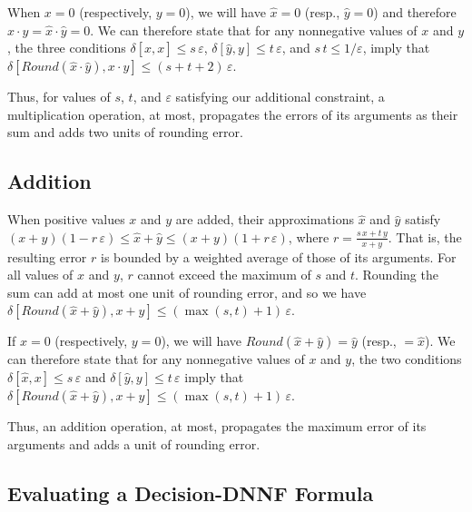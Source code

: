 \documentclass[letterpaper,USenglish,cleveref, autoref, thm-restate]{lipics-v2021}
\newcommand{\approximate}[1]{\hat{#1}}
\newcommand{\approxx}{\approximate{x}}
\newcommand{\approxy}{\approximate{y}}
\newcommand{\round}{\mathit{Round}}
\newcommand{\aerror}{\delta}
\newcommand{\roundepsilon}{\varepsilon}
\begin{document}
When $x=0$ (respectively, $y=0$), we will have $\approxx=0$ (resp., $\approxy = 0$) and therefore $x \cdot y = \approxx \cdot \approxy = 0$.
We can therefore state that  for any nonnegative values of $x$ and $y$, the three conditions $\aerror[\approxx, x] \leq s\,\roundepsilon$,
$\aerror[\approxy, y] \leq t\,\roundepsilon$, and
$s\,t \leq 1/\roundepsilon$, imply that
$\aerror[\round(\approxx \cdot \approxy), x \cdot y] \leq (s+t+2)\,\roundepsilon$.

Thus, for values of $s$, $t$, and $\roundepsilon$ satisfying our
additional constraint, a multiplication operation, at most, propagates
the errors of its arguments as their sum and adds two units of
rounding error.

\subsection{Addition}

When positive values $x$ and $y$ are added, their approximations  $\approxx$ and $\approxy$ satisfy
$(x + y) (1 - r\,\roundepsilon) \leq \approxx + \approxy \leq (x + y) (1 + r\,\roundepsilon)$, where $r = \frac{s\,x + t\,y}{x+y}$.  That is, the resulting error $r$ is bounded by a weighted average
of those of its arguments.  For all values of $x$ and $y$, $r$ cannot exceed the maximum of $s$ and $t$.
Rounding the sum can add at most one unit of rounding error, and so we have
$\aerror[\round(\approxx + \approxy), x + y] \leq (\max(s,t)+1)\,\roundepsilon$.

If $x = 0$ (respectively, $y = 0$), we will have $\round(\approxx + \approxy) = \approxy$ (resp., $= \approxx$).
We can therefore state that for any nonnegative values of $x$ and $y$, the two conditions $\aerror[\approxx, x] \leq s\,\roundepsilon$ and
$\aerror[\approxy, y] \leq t\,\roundepsilon$ imply that 
$\aerror[\round(\approxx + \approxy), x + y] \leq (\max(s,t)+1)\,\roundepsilon$.

Thus, an addition operation, at most, propagates the maximum error of its arguments and adds a unit of rounding error.

\subsection{Evaluating a Decision-DNNF Formula}
\label{sect:error:formula}
\end{document}
